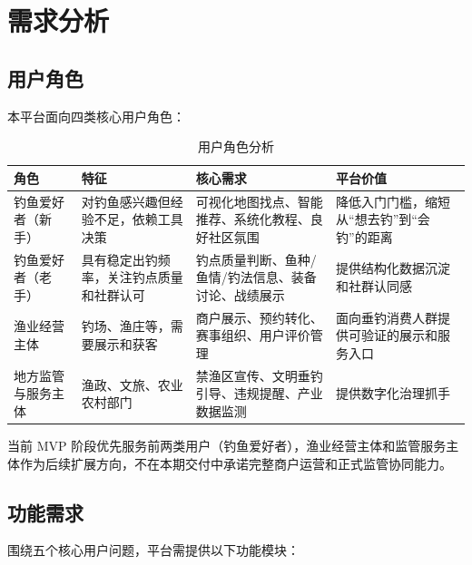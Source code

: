 \section{需求分析}

\subsection{用户角色}

本平台面向四类核心用户角色：

\begin{table}[H]
  \centering
  \caption{用户角色分析}
  \label{tab:user-roles}
  \begin{tabularx}{\textwidth}{p{2.5cm}|p{4.5cm}|p{4.5cm}|p{3.5cm}}
    \toprule
    \textbf{角色} & \textbf{特征} & \textbf{核心需求} & \textbf{平台价值} \\
    \midrule
    钓鱼爱好者（新手） & 对钓鱼感兴趣但经验不足，依赖工具决策 & 可视化地图找点、智能推荐、系统化教程、良好社区氛围 & 降低入门门槛，缩短从“想去钓”到“会钓”的距离 \\
    \hline
    钓鱼爱好者（老手） & 具有稳定出钓频率，关注钓点质量和社群认可 & 钓点质量判断、鱼种/鱼情/钓法信息、装备讨论、战绩展示 & 提供结构化数据沉淀和社群认同感 \\
    \hline
    渔业经营主体 & 钓场、渔庄等，需要展示和获客 & 商户展示、预约转化、赛事组织、用户评价管理 & 面向垂钓消费人群提供可验证的展示和服务入口 \\
    \hline
    地方监管与服务主体 & 渔政、文旅、农业农村部门 & 禁渔区宣传、文明垂钓引导、违规提醒、产业数据监测 & 提供数字化治理抓手 \\
    \bottomrule
  \end{tabularx}
\end{table}

当前 MVP 阶段优先服务前两类用户（钓鱼爱好者），渔业经营主体和监管服务主体作为后续扩展方向，不在本期交付中承诺完整商户运营和正式监管协同能力。

\subsection{功能需求}

围绕五个核心用户问题，平台需提供以下功能模块：

